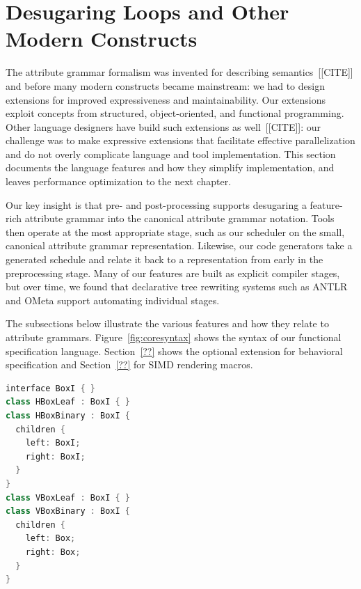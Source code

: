 \section{Desugaring Loops and Other Modern Constructs}
\label{sec:desugaring}

The attribute grammar formalism was invented for describing semantics~[[CITE]] and before many modern constructs became mainstream: we had to design extensions for improved expressiveness and maintainability. Our extensions exploit concepts from structured, object-oriented, and functional programming. Other language designers have build such extensions as well~[[CITE]]: our challenge was to make expressive extensions that facilitate effective parallelization and do not overly complicate language and tool implementation. This section documents the language features and how they simplify implementation, and leaves performance optimization to the next chapter.

Our key insight is that pre- and post-processing supports desugaring a feature-rich attribute grammar into the canonical attribute grammar notation. Tools then operate at the most appropriate stage, such as our scheduler on the small, canonical attribute grammar representation. Likewise, our code generators take a generated schedule and relate it back to a representation from early in the preprocessing stage. Many of our features are built as explicit compiler stages, but over time, we found that declarative tree rewriting systems such as ANTLR and OMeta support automating individual stages.

The subsections below illustrate the various features and how they relate to attribute grammars. Figure~\ref{fig:coresyntax} shows the syntax of our functional specification language. Section~\ref{??} shows the optional extension for behavioral specification and Section~\ref{??} for SIMD rendering macros. 


\newsavebox{\ifacegrammar}
\begin{lrbox}{\ifacegrammar}%
\begin{lstlisting}[language=C++,morekeywords={interface,class,children}]
interface BoxI { }
class HBoxLeaf : BoxI { }
class HBoxBinary : BoxI { 
  children {
    left: BoxI;
    right: BoxI;
  }
}
class VBoxLeaf : BoxI { }
class VBoxBinary : BoxI { 
  children {
    left: Box;
    right: Box;
  }
}
\end{lstlisting}
\end{lrbox}




